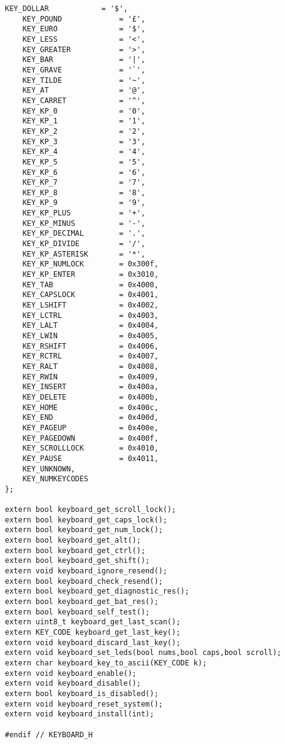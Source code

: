 \documentclass[document.tex]{subfiles}
\begin{document}
\begin{english}
\begin{lstlisting}[label=keyboard.h,caption=\en{Keybaord Driver Interface}]
	KEY_DOLLAR            = '$',
	KEY_POUND             = '£',
	KEY_EURO              = '$',
	KEY_LESS              = '<',
	KEY_GREATER           = '>',
	KEY_BAR               = '|',
	KEY_GRAVE             = '`',
	KEY_TILDE             = '~',
	KEY_AT                = '@',
	KEY_CARRET            = '^',
	KEY_KP_0              = '0',
	KEY_KP_1              = '1',
	KEY_KP_2              = '2',
	KEY_KP_3              = '3',
	KEY_KP_4              = '4',
	KEY_KP_5              = '5',
	KEY_KP_6              = '6',
	KEY_KP_7              = '7',
	KEY_KP_8              = '8',
	KEY_KP_9              = '9',
	KEY_KP_PLUS           = '+',
	KEY_KP_MINUS          = '-',
	KEY_KP_DECIMAL        = '.',
	KEY_KP_DIVIDE         = '/',
	KEY_KP_ASTERISK       = '*',
	KEY_KP_NUMLOCK        = 0x300f,
	KEY_KP_ENTER          = 0x3010,
	KEY_TAB               = 0x4000,
	KEY_CAPSLOCK          = 0x4001,
	KEY_LSHIFT            = 0x4002,
	KEY_LCTRL             = 0x4003,
	KEY_LALT              = 0x4004,
	KEY_LWIN              = 0x4005,
	KEY_RSHIFT            = 0x4006,
	KEY_RCTRL             = 0x4007,
	KEY_RALT              = 0x4008,
	KEY_RWIN              = 0x4009,
	KEY_INSERT            = 0x400a,
	KEY_DELETE            = 0x400b,
	KEY_HOME              = 0x400c,
	KEY_END               = 0x400d,
	KEY_PAGEUP            = 0x400e,
	KEY_PAGEDOWN          = 0x400f,
	KEY_SCROLLLOCK        = 0x4010,
	KEY_PAUSE             = 0x4011,
	KEY_UNKNOWN,
	KEY_NUMKEYCODES
};

extern bool keyboard_get_scroll_lock();
extern bool keyboard_get_caps_lock();
extern bool keyboard_get_num_lock();
extern bool keyboard_get_alt();
extern bool keyboard_get_ctrl();
extern bool keyboard_get_shift();
extern void keyboard_ignore_resend();
extern bool keyboard_check_resend();
extern bool keyboard_get_diagnostic_res();
extern bool keyboard_get_bat_res();
extern bool keyboard_self_test();
extern uint8_t keyboard_get_last_scan();
extern KEY_CODE keyboard_get_last_key();
extern void keyboard_discard_last_key();
extern void keyboard_set_leds(bool nums,bool caps,bool scroll);
extern char keyboard_key_to_ascii(KEY_CODE k);
extern void keyboard_enable();
extern void keyboard_disable();
extern bool keyboard_is_disabled();
extern void keyboard_reset_system();
extern void keyboard_install(int);

#endif // KEYBOARD_H

\end{lstlisting}
\end{english}
\end{document}
